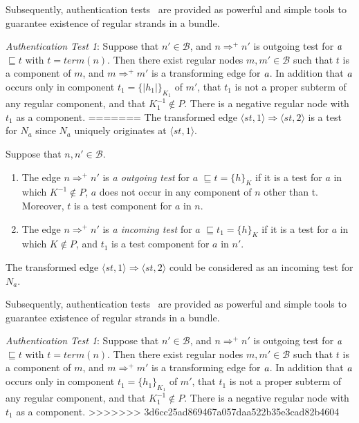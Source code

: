 Subsequently, authentication tests~\cite{authenticationtests} are provided as powerful and simple tools to guarantee existence of regular strands in a bundle. 

\emph{Authentication Test 1}: Suppose that $n' \in \mathcal{B}$, and $n \Rightarrow^+ n'$ is outgoing test for $\emph{a}$ $\sqsubseteq t$ with $t = term(n)$. Then there exist regular nodes $m,m' \in \mathcal{B}$ such that $t$ is a component of $m$, and  $m \Rightarrow^+m'$ is a transforming edge for $\emph{a}$. In addition that $\emph{a}$ occurs only in component $t_1=\{|h_1|\}_{K_1}$ of $m'$, that $t_1$ is not a proper subterm of any regular component, and that $K^{-1}_1 \not\in P$. There is a negative regular node with $t_1$ as a component. 
=======
The transformed edge $\langle st,1\rangle \Rightarrow \langle st,2\rangle$ is a test for $N_a$ since $N_a$ uniquely originates at $\langle st,1\rangle$. 

\begin{Definition} Suppose that $n, n' \in \mathcal{B}$.
\begin{enumerate}
\item The edge $n \Rightarrow^+ n'$ is \emph{a outgoing test} for $a$ $\sqsubseteq t = \{h\}_K$ if it is a test for $a$ in which $K^{-1} \not\in P$, $a$ does not occur in any component of $n$ other than t. Moreover, $t$ is a test component for $a$ in $n$.
\item The edge $n \Rightarrow^+ n'$ is \emph{a incoming test} for $a$ $\sqsubseteq t_1 = \{h\}_K$ if it is a test for $a$ in which $K \not\in P$, and $t_1$ is a test component for $a$ in $n'$.
\end{enumerate}
\end{Definition}

The transformed edge $\langle st,1\rangle \Rightarrow \langle st,2\rangle$ could be considered as an incoming test for $N_a$. 

Subsequently, authentication tests~\cite{authenticationtests} are provided as powerful and simple tools to guarantee existence of regular strands in a bundle. 

\emph{Authentication Test 1}: Suppose that $n' \in \mathcal{B}$, and $n \Rightarrow^+ n'$ is outgoing test for $\emph{a}$ $\sqsubseteq t$ with $t = term(n)$. Then there exist regular nodes $m,m' \in \mathcal{B}$ such that $t$ is a component of $m$, and  $m \Rightarrow^+m'$ is a transforming edge for $\emph{a}$. In addition that $\emph{a}$ occurs only in component $t_1=\{h_1\}_{K_1}$ of $m'$, that $t_1$ is not a proper subterm of any regular component, and that $K^{-1}_1 \not\in P$. There is a negative regular node with $t_1$ as a component. 
>>>>>>> 3d6cc25ad869467a057daa522b35e3cad82b4604


